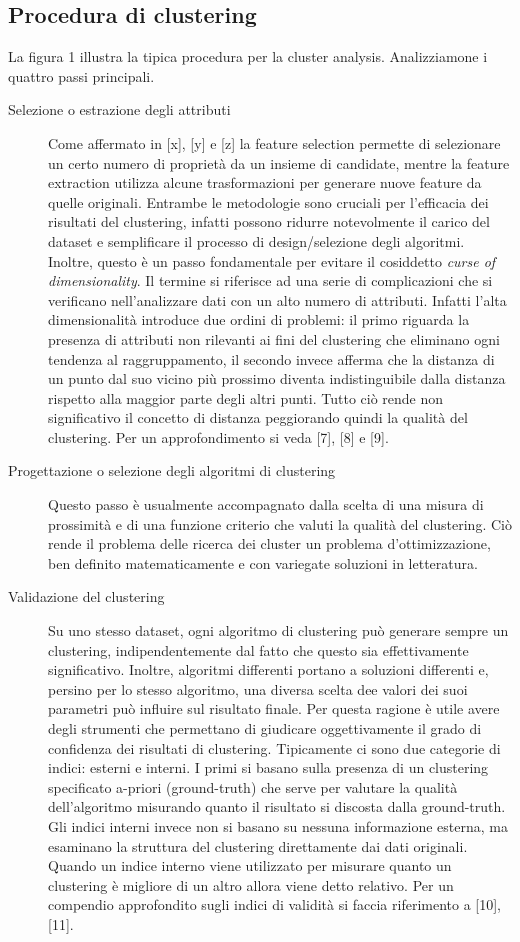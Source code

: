 \subsection{Procedura di clustering}

La figura 1 illustra la tipica procedura per la cluster analysis. Analizziamone i quattro passi principali.

\begin{description}
\item[Selezione o estrazione degli attributi] Come affermato in [x], [y] e [z] la feature selection permette di selezionare un certo numero di propriet\`a da un insieme di candidate, mentre la feature extraction utilizza alcune trasformazioni per generare nuove feature da quelle originali. Entrambe le metodologie sono cruciali per l'efficacia dei risultati del clustering, infatti possono ridurre notevolmente il carico del dataset e semplificare il processo di design/selezione degli algoritmi. Inoltre, questo \`e un passo fondamentale per evitare il cosiddetto \textit{curse of dimensionality}. Il termine si riferisce ad una serie di complicazioni che si verificano nell'analizzare dati con un alto numero di attributi. Infatti l'alta dimensionalit\`a introduce due ordini di problemi: il primo riguarda la presenza di attributi non rilevanti ai fini del clustering che eliminano ogni tendenza al raggruppamento, il secondo invece afferma che la distanza di un punto dal suo vicino pi\`u prossimo diventa indistinguibile dalla distanza rispetto alla maggior parte degli altri punti. Tutto ci\`o rende non significativo il concetto di distanza peggiorando quindi la qualit\`a del clustering. Per un approfondimento si veda [7], [8] e [9]. 
\item[Progettazione o selezione degli algoritmi di clustering] Questo passo \`e usualmente accompagnato dalla scelta di una misura di prossimit\`a e di una funzione criterio che valuti la qualit\`a del clustering. Ci\`o rende il problema delle ricerca dei cluster un problema d'ottimizzazione, ben definito matematicamente e con variegate soluzioni in letteratura. 
\item[Validazione del clustering] Su uno stesso dataset, ogni algoritmo di clustering pu\`o generare sempre un clustering, indipendentemente dal fatto che questo sia effettivamente significativo. Inoltre, algoritmi differenti portano a soluzioni differenti e, persino per lo stesso algoritmo, una diversa scelta dee valori dei suoi parametri pu\`o influire sul risultato finale. Per questa ragione \`e utile avere degli strumenti che permettano di giudicare oggettivamente il grado di confidenza dei risultati di clustering. Tipicamente ci sono due categorie di indici: esterni e interni. I primi si basano sulla presenza di un clustering specificato a-priori (ground-truth) che serve per valutare la qualit\`a dell'algoritmo misurando quanto il risultato si discosta dalla ground-truth. Gli indici interni invece non si basano su nessuna informazione esterna, ma esaminano la struttura del clustering direttamente dai dati originali. Quando un indice interno viene utilizzato per misurare quanto un clustering \`e migliore di un altro allora viene detto relativo. Per un compendio approfondito sugli indici di validit\`a si faccia riferimento a [10], [11].

\end{description}
